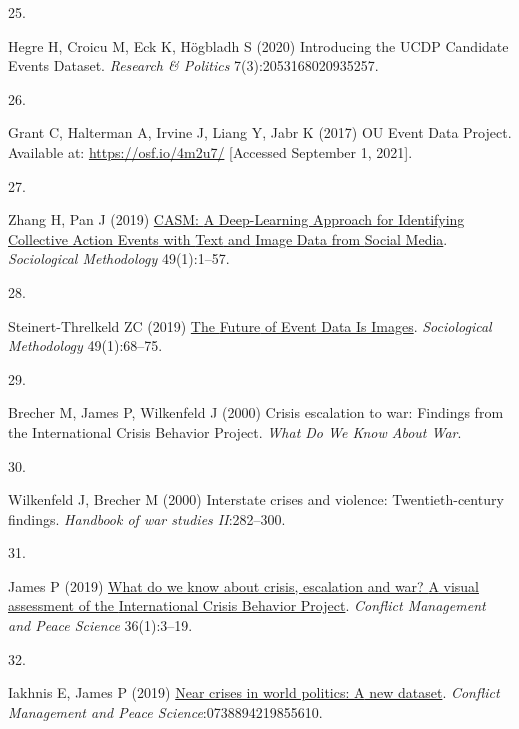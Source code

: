 \documentclass{article}
\newlength{\cslhangindent}
\newlength{\csllabelwidth}
\newlength{\cslentryspacingunit} %
\newenvironment{CSLReferences}[2] %
 {%
  \setlength{\parindent}{0pt}
  \ifodd #1
  \let\oldpar\par
  \def\par{\hangindent=\cslhangindent\oldpar}
  \fi
  \setlength{\parskip}{#2\cslentryspacingunit}
 }%
 {}
\newcommand{\CSLLeftMargin}[1]{\parbox[t]{\csllabelwidth}{#1}}
\newcommand{\CSLRightInline}[1]{\parbox[t]{\linewidth - \csllabelwidth}{#1}\break}
\begin{document}
\begin{CSLReferences}{0}{0}
\leavevmode{}%
\CSLLeftMargin{25. }
\CSLRightInline{Hegre H, Croicu M, Eck K, Högbladh S (2020) Introducing
the {UCDP Candidate Events Dataset}. \emph{Research \& Politics}
7(3):2053168020935257.}

\leavevmode{}%
\CSLLeftMargin{26. }
\CSLRightInline{Grant C, Halterman A, Irvine J, Liang Y, Jabr K (2017)
{OU Event Data Project}. Available at: \url{https://osf.io/4m2u7/}
{[}Accessed September 1, 2021{]}.}

\leavevmode{}%
\CSLLeftMargin{27. }
\CSLRightInline{Zhang H, Pan J (2019)
\href{https://doi.org/10.1177/0081175019860244}{{CASM}: {A Deep-Learning
Approach} for {Identifying Collective Action Events} with {Text} and
{Image Data} from {Social Media}}. \emph{Sociological Methodology}
49(1):1--57.}

\leavevmode{}%
\CSLLeftMargin{28. }
\CSLRightInline{Steinert-Threlkeld ZC (2019)
\href{https://doi.org/10.1177/0081175019860238}{The {Future} of {Event
Data Is Images}}. \emph{Sociological Methodology} 49(1):68--75.}

\leavevmode{}%
\CSLLeftMargin{29. }
\CSLRightInline{Brecher M, James P, Wilkenfeld J (2000) Crisis
escalation to war: {Findings} from the {International Crisis Behavior
Project}. \emph{What Do We Know About War}.}

\leavevmode{}%
\CSLLeftMargin{30. }
\CSLRightInline{Wilkenfeld J, Brecher M (2000) Interstate crises and
violence: Twentieth-century findings. \emph{Handbook of war studies
II}:282--300.}

\leavevmode{}%
\CSLLeftMargin{31. }
\CSLRightInline{James P (2019)
\href{https://doi.org/10.1177/0738894218793135}{What do we know about
crisis, escalation and war? {A} visual assessment of the {International
Crisis Behavior Project}}. \emph{Conflict Management and Peace Science}
36(1):3--19.}

\leavevmode{}%
\CSLLeftMargin{32. }
\CSLRightInline{Iakhnis E, James P (2019)
\href{https://doi.org/10.1177/0738894219855610}{Near crises in world
politics: {A} new dataset}. \emph{Conflict Management and Peace
Science}:0738894219855610.}


\end{CSLReferences}
\end{document}
